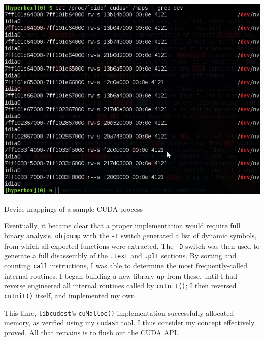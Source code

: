 \documentclass[letterpaper,10pt]{article}
\makeatletter
\newenvironment{figurehere}
{\def\@captype{figure}}
{}
\makeatother
\begin{document}
\begin{multicols}{2}
\vspace{3 mm}
\begin{figurehere}
\centering
\includegraphics[width=\columnwidth]{texobjs/cudashmaps.png}
\caption{Device mappings of a sample CUDA process}
\end{figurehere}
\vspace{3 mm}

Eventually, it became clear that a proper implementation would require full
binary analysis. \texttt{objdump} with the \texttt{-T} switch generated a list
of dynamic symbols, from which all exported functions were extracted. The
\texttt{-D} switch was then used to generate a full disassembly of the \texttt{.text}
and \texttt{.plt} sections. By sorting and counting \texttt{call} instructions,
I was able to determine the most frequently-called internal routines. I began
building a new library up from these, until I had reverse engineered all internal
routines called by \texttt{cuInit()}; I then reversed \texttt{cuInit()} itself,
and implemented my own.

This time, \texttt{libcudest}'s \texttt{cuMalloc()} implementation successfully allocated memory,
as verified using my \texttt{cudash} tool. I thus consider my concept effectively proved. All that remains is to flush
out the CUDA API.


\end{multicols}
\end{document}
